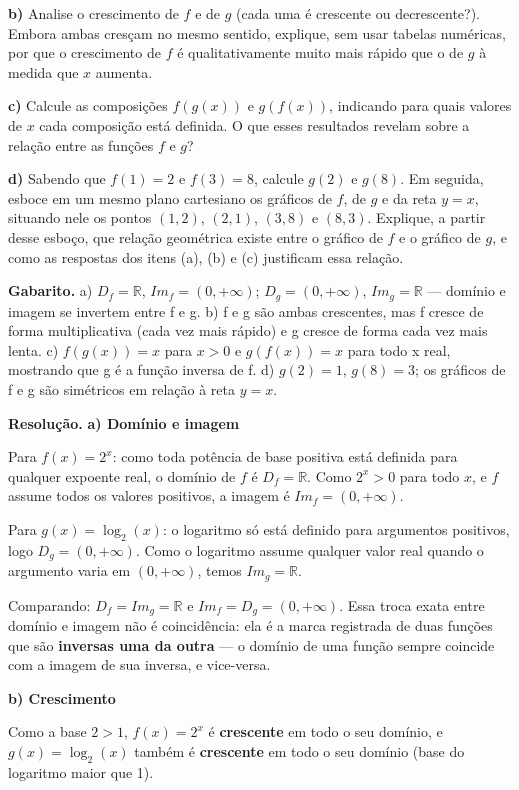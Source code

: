 \documentclass[11pt,a4paper]{article}
\begin{document}
\textbf{b)} Analise o crescimento de $f$ e de $g$ (cada uma é crescente ou decrescente?). Embora ambas cresçam no mesmo sentido, explique, sem usar tabelas numéricas, por que o crescimento de $f$ é qualitativamente muito mais rápido que o de $g$ à medida que $x$ aumenta.

\textbf{c)} Calcule as composições $f(g(x))$ e $g(f(x))$, indicando para quais valores de $x$ cada composição está definida. O que esses resultados revelam sobre a relação entre as funções $f$ e $g$?

\textbf{d)} Sabendo que $f(1) = 2$ e $f(3) = 8$, calcule $g(2)$ e $g(8)$. Em seguida, esboce em um mesmo plano cartesiano os gráficos de $f$, de $g$ e da reta $y = x$, situando nele os pontos $(1,2)$, $(2,1)$, $(3,8)$ e $(8,3)$. Explique, a partir desse esboço, que relação geométrica existe entre o gráfico de $f$ e o gráfico de $g$, e como as respostas dos itens (a), (b) e (c) justificam essa relação.

\textbf{Gabarito.} a) $D_f=\mathbb{R}$, $Im_f=(0,+\infty)$; $D_g=(0,+\infty)$, $Im_g=\mathbb{R}$ — domínio e imagem se invertem entre f e g. b) f e g são ambas crescentes, mas f cresce de forma multiplicativa (cada vez mais rápido) e g cresce de forma cada vez mais lenta. c) $f(g(x))=x$ para $x>0$ e $g(f(x))=x$ para todo x real, mostrando que g é a função inversa de f. d) $g(2)=1$, $g(8)=3$; os gráficos de f e g são simétricos em relação à reta $y=x$.

\textbf{Resolução.} \textbf{a) Domínio e imagem}

Para $f(x) = 2^{x}$: como toda potência de base positiva está definida para qualquer expoente real, o domínio de $f$ é $D_f = \mathbb{R}$. Como $2^x > 0$ para todo $x$, e $f$ assume todos os valores positivos, a imagem é $Im_f = (0, +\infty)$.

Para $g(x) = \log_2(x)$: o logaritmo só está definido para argumentos positivos, logo $D_g = (0, +\infty)$. Como o logaritmo assume qualquer valor real quando o argumento varia em $(0,+\infty)$, temos $Im_g = \mathbb{R}$.

Comparando: $D_f = Im_g = \mathbb{R}$ e $Im_f = D_g = (0,+\infty)$. Essa troca exata entre domínio e imagem não é coincidência: ela é a marca registrada de duas funções que são \textbf{inversas uma da outra} — o domínio de uma função sempre coincide com a imagem de sua inversa, e vice-versa.

\textbf{b) Crescimento}

Como a base $2 > 1$, $f(x) = 2^x$ é \textbf{crescente} em todo o seu domínio, e $g(x) = \log_2(x)$ também é \textbf{crescente} em todo o seu domínio (base do logaritmo maior que 1).
\end{document}
